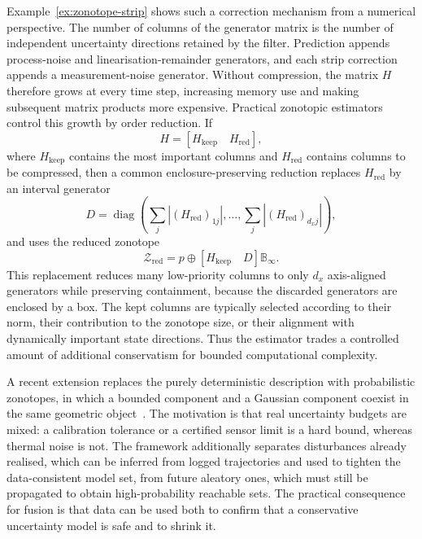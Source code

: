 \documentclass[graybox,envcountchap]{style/SNmono}
\begin{document}
Example~\ref{ex:zonotope-strip} shows such a correction mechanism from a numerical perspective. The number of columns of the generator matrix is the number of independent uncertainty directions retained by the filter. Prediction appends process-noise and linearisation-remainder generators, and each strip correction appends a measurement-noise generator. Without compression, the matrix $H$ therefore grows at every time step, increasing memory use and making subsequent matrix products more expensive. Practical zonotopic estimators control this growth by order reduction. If
\begin{equation}
H=\left[H_{\mathrm{keep}}\quad H_{\mathrm{red}}\right],
\end{equation}
where $H_{\mathrm{keep}}$ contains the most important columns and $H_{\mathrm{red}}$ contains columns to be compressed, then a common enclosure-preserving reduction replaces $H_{\mathrm{red}}$ by an interval generator
\begin{equation}
D=\operatorname{diag}\!\left(\sum_j |(H_{\mathrm{red}})_{1j}|,\ldots,
\sum_j |(H_{\mathrm{red}})_{d_xj}|\right),
\end{equation}
and uses the reduced zonotope
\begin{equation}
\mathcal{Z}_{\mathrm{red}}
=
p\oplus
\left[H_{\mathrm{keep}}\quad D\right]\mathbb{B}_{\infty}.
\end{equation}
This replacement reduces many low-priority columns to only $d_x$ axis-aligned generators while preserving containment, because the discarded generators are enclosed by a box. The kept columns are typically selected according to their norm, their contribution to the zonotope size, or their alignment with dynamically important state directions. Thus the estimator trades a controlled amount of additional conservatism for bounded computational complexity.



A recent extension replaces the purely deterministic description with probabilistic zonotopes, in which a bounded component and a Gaussian component coexist in the same geometric object~\cite{modares2026reachability}. The motivation is that real uncertainty budgets are mixed: a calibration tolerance or a certified sensor limit is a hard bound, whereas thermal noise is not. The framework additionally separates disturbances already realised, which can be inferred from logged trajectories and used to tighten the data-consistent model set, from future aleatory ones, which must still be propagated to obtain high-probability reachable sets. The practical consequence for fusion is that data can be used both to confirm that a conservative uncertainty model is safe and to shrink it.
\end{document}
